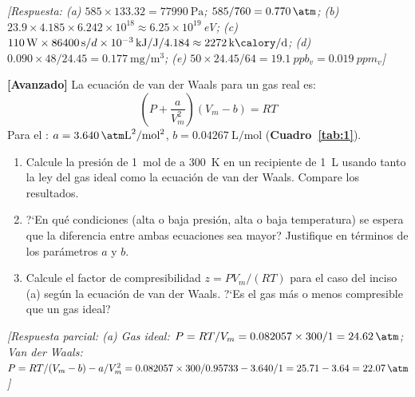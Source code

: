 \begin{bloque_ejercicios}
\begin{ejercicios}
\textit{[Respuesta:
(a) $585\times133.32 = \SI{77990}{\pascal}$;
    $585/760 = \SI{0.770}{\atm}$;
(b) $23.9\times4.185\times6.242\times10^{18}
\approx 6.25\times10^{19}$\,eV;
(c) $110\,\text{W}\times86400\,\text{s}/d
    \times10^{-3}\,\text{kJ/J}/4.184
    \approx \SI{2272}{\kilo\calory\per\day}$;
(d) $0.090\times48/24.45 = \SI{0.177}{\milli\gram\per\cubic\metre}$;
(e) $50\times24.45/64 = \SI{19.1}{ppb_v} = \SI{0.019}{ppm_v}$]}

\item \textbf{[Avanzado]} La ecuaci\'on de van der Waals para un
gas real es:
\[
    \left(P + \frac{a}{V_m^2}\right)(V_m - b) = RT
\]
Para el : $a = \SI{3.640}{\atm\liter^2\per\mole^2}$,
$b = \SI{0.04267}{\liter\per\mole}$
(\textbf{Cuadro~\ref{tab:1}}).

\begin{enumerate}[label=\alph*)]
    \item Calcule la presi\'on de \SI{1}{\mole} de 
          a \SI{300}{\kelvin} en un recipiente de \SI{1}{\liter}
          usando tanto la ley del gas ideal como la ecuaci\'on
          de van der Waals. Compare los resultados.
    \item ?`En qu\'e condiciones (alta o baja presi\'on,
          alta o baja temperatura) se espera que la diferencia
          entre ambas ecuaciones sea mayor? Justifique en
          t\'erminos de los par\'ametros $a$ y $b$.
    \item Calcule el factor de compresibilidad
          $z = PV_m/(RT)$ para el caso del inciso (a)
          seg\'un la ecuaci\'on de van der Waals.
          ?`Es el gas m\'as o menos compresible que un gas ideal?
\end{enumerate}

\textit{[Respuesta parcial:
(a) Gas ideal: $P = RT/V_m = 0.082057\times300/1
= \SI{24.62}{\atm}$;
Van der Waals: $P = RT/(V_m-b) - a/V_m^2
= 0.082057\times300/0.95733 - 3.640/1
= 25.71 - 3.64 = \SI{22.07}{\atm}$]}

\end{ejercicios}

\end{bloque_ejercicios}
